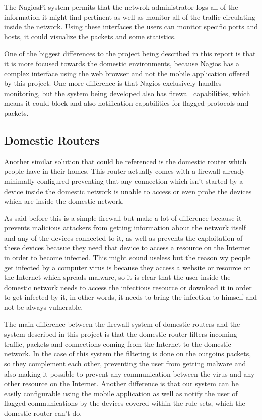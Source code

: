 The NagiosPi system permits that the netwrok administrator logs all of the
information it might find pertinent as well as monitor all of the traffic
circulating inside the network. Using these interfaces the users can monitor
specific ports and hosts, it could visualize the packets and some statistics.

One of the biggest differences to the project being described in this report is
that it is more focused towards the domestic environments, because Nagios has a
complex interface using the web browser and not the mobile application offered
by this project. One more difference is that Nagios exclusively handles
monitoring, but the system being developed also has firewall capabilities, which
means it could block and also notification capabilities for flagged protocols
and packets.

\subsection{Domestic Routers}
\label{chap2:sec:similar-sol:sub:routers}
Another similar solution that could be referenced is the domestic router which
people have in their homes. This router actually comes with a firewall already
minimally configured preventing that any connection which isn't started by a
device inside the domestic network is unable to access or even probe the devices
which are inside the domestic network.

As said before this is a simple firewall but make a lot of difference because it
prevents malicious attackers from getting information about the network itself
and any of the devices connected to it, as well as prevents the exploitation of
these devices becasue they need that device to access a resource on the Internet
in order to become infected. This might sound useless but the reason wy people
get infected by a computer virus is because they access a website or resource on
the Internet which spreads malware, so it is clear that the user inside the
domestic network needs to access the infectious resource or download it in order
to get infected by it, in other words, it needs to bring the infection to
himself and not be always vulnerable.

The main difference between the firewall system of domestic routers and the
system described in this project is that the domestic router filters incoming
traffic, packets and connections coming from the Internet to the domestic
network. In the case of this system the filtering is done on the outgoins
packets, so they complement each other, preventing the user from getting malware
and also making it possible to prevent any communication between the virus and
any other resource on the Internet.
Another difference is that our system can be easily configurable using the
mobile application as well as notify the user of flagged communications by the
devices covered within the rule sets, which the domestic router can't do.

